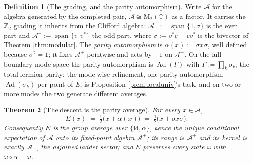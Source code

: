 \documentclass[11pt]{article}
\newtheorem{theorem}{Theorem}[section]
\theoremstyle{definition}
\newtheorem{definition}[theorem]{Definition}
\newcommand{\C}{\mathbb{C}}
\newcommand{\Mat}{\mathrm{M}}
\newcommand{\id}{\mathrm{id}}
\newcommand{\Aa}{\mathcal{A}}
\newcommand{\Aev}{\mathcal{A}^{+}}
\newcommand{\Aod}{\mathcal{A}^{-}}
\begin{document}
\begin{definition}[The grading, and the parity automorphism]\label{def:grading}
Write $\Aa$ for the algebra generated by the completed pair, $\Aa \cong \Mat_2(\C)$ as a factor. It carries the $\mathbb{Z}_2$ grading it inherits from the Clifford algebra: $\Aev := \operatorname{span}\{1, \sigma\}$ is the even part and $\Aod := \operatorname{span}\{v, v^{*}\}$ the odd part, where $\sigma := v^{*}v - vv^{*}$ is the bivector of Theorem \ref{thm:modular}. The \emph{parity automorphism} is $\alpha(x) := \sigma x \sigma$, well defined because $\sigma^{2} = 1$; it fixes $\Aev$ pointwise and acts by $-1$ on $\Aod$. On the full boundary mode space the parity automorphism is $\operatorname{Ad}(\Gamma)$ with $\Gamma := \prod_k \sigma_k$, the total fermion parity; the mode-wise refinement, one parity automorphism $\operatorname{Ad}(\sigma_k)$ per point of $E$, is Proposition \ref{prem:localuniv}'s task, and on two or more modes the two generate different averages.
\end{definition}

\begin{theorem}[The descent is the parity average]\label{thm:parityavg}
For every $x \in \Aa$,
\[
E(x) \;=\; \tfrac12\bigl(x + \alpha(x)\bigr) \;=\; \tfrac12\bigl(x + \sigma x \sigma\bigr) .
\]
Consequently $E$ is the group average over $\{\id, \alpha\}$, hence the unique conditional expectation of $\Aa$ onto its fixed-point algebra $\Aev$; its range is $\Aev$ and its kernel is exactly $\Aod$, the adjoined ladder sector; and $E$ preserves every state $\omega$ with $\omega \circ \alpha = \omega$.
\end{theorem}
\end{document}
